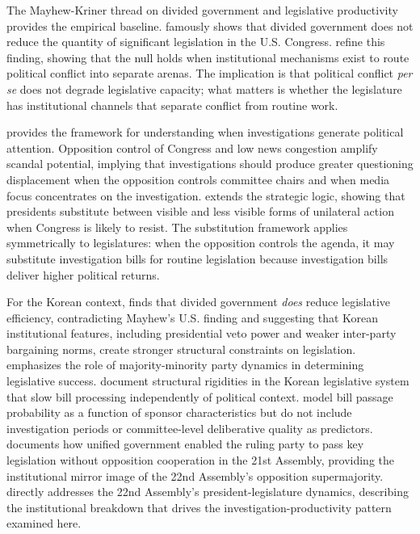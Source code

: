 \documentclass[11pt]{article}
\begin{document}
The Mayhew-Kriner thread on divided government and legislative productivity provides the empirical baseline. \citet{mayhew1991} famously shows that divided government does not reduce the quantity of significant legislation in the U.S. Congress. \citet{edwards1997} refine this finding, showing that the null holds when institutional mechanisms exist to route political conflict into separate arenas. The implication is that political conflict \textit{per se} does not degrade legislative capacity; what matters is whether the legislature has institutional channels that separate conflict from routine work.

\citet{nyhan2014} provides the framework for understanding when investigations generate political attention. Opposition control of Congress and low news congestion amplify scandal potential, implying that investigations should produce greater questioning displacement when the opposition controls committee chairs and when media focus concentrates on the investigation. \citet{kaufman2023} extends the strategic logic, showing that presidents substitute between visible and less visible forms of unilateral action when Congress is likely to resist. The substitution framework applies symmetrically to legislatures: when the opposition controls the agenda, it may substitute investigation bills for routine legislation because investigation bills deliver higher political returns.

For the Korean context, \citet{lee2012} finds that divided government \textit{does} reduce legislative efficiency, contradicting Mayhew's U.S. finding and suggesting that Korean institutional features, including presidential veto power and weaker inter-party bargaining norms, create stronger structural constraints on legislation. \citet{jeon2022} emphasizes the role of majority-minority party dynamics in determining legislative success. \citet{kimlee2026} document structural rigidities in the Korean legislative system that slow bill processing independently of political context. \citet{anpark2025} model bill passage probability as a function of sponsor characteristics but do not include investigation periods or committee-level deliberative quality as predictors. \citet{park2025} documents how unified government enabled the ruling party to pass key legislation without opposition cooperation in the 21st Assembly, providing the institutional mirror image of the 22nd Assembly's opposition supermajority. \citet{jeon2025} directly addresses the 22nd Assembly's president-legislature dynamics, describing the institutional breakdown that drives the investigation-productivity pattern examined here.
\end{document}
